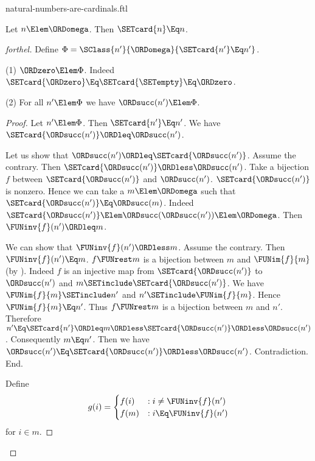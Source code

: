 \documentclass{stex}
\begin{document}
\begin{smodule}{natural-numbers-are-cardinals.ftl}

\begin{theorem}[forthel]
  Let $n \Elem \ORDomega$.
  Then $\SETcard{n} \Eq n$.
\end{theorem}
\begin{proof}[forthel]
  Define $\Phi = \SClass{n'}{\ORDomega}{\SETcard{n'} \Eq n'}$.

  (1) $\ORDzero \Elem \Phi$.
  Indeed $\SETcard{\ORDzero} \Eq \SETcard{\SETempty} \Eq \ORDzero$.

  (2) For all $n' \Elem \Phi$ we have $\ORDsucc(n') \Elem \Phi$.
  \begin{proof}
    Let $n' \Elem \Phi$.
    Then $\SETcard{n'} \Eq n'$.
    We have $\SETcard{\ORDsucc(n')} \ORDleq \ORDsucc(n')$.

    Let us show that $\ORDsucc(n') \ORDleq \SETcard{\ORDsucc(n')}$.
      Assume the contrary.
      Then $\SETcard{\ORDsucc(n')} \ORDless \ORDsucc(n')$.
      Take a bijection $f$ between $\SETcard{\ORDsucc(n')}$ and $\ORDsucc(n')$.
      $\SETcard{\ORDsucc(n')}$ is nonzero.
      Hence we can take a $m \Elem \ORDomega$ such that $\SETcard{\ORDsucc(n')} \Eq \ORDsucc(m)$.
      Indeed $\SETcard{\ORDsucc(n')} \Elem \ORDsucc(\ORDsucc(n')) \Elem \ORDomega$.
      Then $\FUNinv{f}(n') \ORDleq m$.

      We can show that $\FUNinv{f}(n') \ORDless m$.
        Assume the contrary.
        Then $\FUNinv{f}(n') \Eq m$.
        $f \FUNrest m$ is a bijection between $m$ and $\FUNim{f}{m}$ (by ).
        Indeed $f$ is an injective map from $\SETcard{\ORDsucc(n')}$ to $\ORDsucc(n')$ and
        $m \SETinclude \SETcard{\ORDsucc(n')}$.
        We have $\FUNim{f}{m} \SETinclude n'$ and $n' \SETinclude \FUNim{f}{m}$.
        Hence $\FUNim{f}{m} \Eq n'$.
        Thus $f \FUNrest m$ is a bijection between $m$ and $n'$.
        Therefore $n'
          \Eq \SETcard{n'}
          \ORDleq m
          \ORDless \SETcard{\ORDsucc(n')}
          \ORDless \ORDsucc(n')$.
        Consequently $m \Eq n'$.
        Then we have $\ORDsucc(n') \Eq \SETcard{\ORDsucc(n')} \ORDless \ORDsucc(n')$.
        Contradiction.
      End.

      Define \[ g(i) =
        \begin{cases}
          f(i)  & : i \neq \FUNinv{f}(n')
          \\
          f(m)  & : i \Eq \FUNinv{f}(n')
        \end{cases} \]
      for $i \in m$.


\end{proof}
\end{proof}
\end{smodule}
\end{document}
